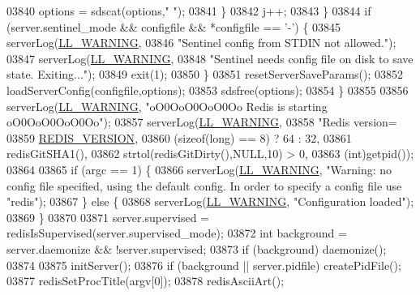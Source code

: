 \begin{DoxyCode}
{{{{{{{{{{{{{{{{{{{{{{{{{{{{{{{{{{{{{{{{{{{{{{{{{{{{{{{{{{{{{{{{{{{{{{{{{{{{{{{{{{{{{{{{{{{{{{{{{{{{{{{{{{{{{{{{{{{{{{{{{{{{{{{{{{{{{{{{{{{{{{{{{{{{{{{{{{{{{{{{{{{{{{{{{{{{{{{{{{03840                 options = sdscat(options,\textcolor{stringliteral}{" "});
03841             \}
03842             j++;
03843         \}
03844         \textcolor{keywordflow}{if} (server.sentinel\_mode && configfile && *configfile == \textcolor{stringliteral}{'-'}) \{
03845             serverLog(\hyperlink{server_8h_a31229b9334bba7d6be2a72970967a14b}{LL\_WARNING},
03846                 \textcolor{stringliteral}{"Sentinel config from STDIN not allowed."});
03847             serverLog(\hyperlink{server_8h_a31229b9334bba7d6be2a72970967a14b}{LL\_WARNING},
03848                 \textcolor{stringliteral}{"Sentinel needs config file on disk to save state.  Exiting..."});
03849             exit(1);
03850         \}
03851         resetServerSaveParams();
03852         loadServerConfig(configfile,options);
03853         sdsfree(options);
03854     \}
03855 
03856     serverLog(\hyperlink{server_8h_a31229b9334bba7d6be2a72970967a14b}{LL\_WARNING}, \textcolor{stringliteral}{"oO0OoO0OoO0Oo Redis is starting oO0OoO0OoO0Oo"});
03857     serverLog(\hyperlink{server_8h_a31229b9334bba7d6be2a72970967a14b}{LL\_WARNING},
03858         \textcolor{stringliteral}{"Redis version=%
03859             \hyperlink{version_8h_a357a0d302ef7fbb42bf2db0632b9f7fe}{REDIS\_VERSION},
03860             (\textcolor{keyword}{sizeof}(\textcolor{keywordtype}{long}) == 8) ? 64 : 32,
03861             redisGitSHA1(),
03862             strtol(redisGitDirty(),NULL,10) > 0,
03863             (\textcolor{keywordtype}{int})getpid());
03864 
03865     \textcolor{keywordflow}{if} (argc == 1) \{
03866         serverLog(\hyperlink{server_8h_a31229b9334bba7d6be2a72970967a14b}{LL\_WARNING}, \textcolor{stringliteral}{"Warning: no config file specified, using the default config.
       In order to specify a config file use %
      "redis"});
03867     \} \textcolor{keywordflow}{else} \{
03868         serverLog(\hyperlink{server_8h_a31229b9334bba7d6be2a72970967a14b}{LL\_WARNING}, \textcolor{stringliteral}{"Configuration loaded"});
03869     \}
03870 
03871     server.supervised = redisIsSupervised(server.supervised\_mode);
03872     \textcolor{keywordtype}{int} background = server.daemonize && !server.supervised;
03873     \textcolor{keywordflow}{if} (background) daemonize();
03874 
03875     initServer();
03876     \textcolor{keywordflow}{if} (background || server.pidfile) createPidFile();
03877     redisSetProcTitle(argv[0]);
03878     redisAsciiArt();
}}}}}}}}}}}}}}}}}}}}}}}}}}}}}}}}}}}}}}}}}}}}}}}}}}}}}}}}}}}}}}}}}}}}}}}}}}}}}}}}}}}}}}}}}}}}}}}}}}}}}}}}}}}}}}}}}}}}}}}}}}}}}}}}}}}}}}}}}}}}}}}}}}}}}}}}}}}}}}}}}}}}}}}}}}}}}}}}}}}
\end{DoxyCode}
